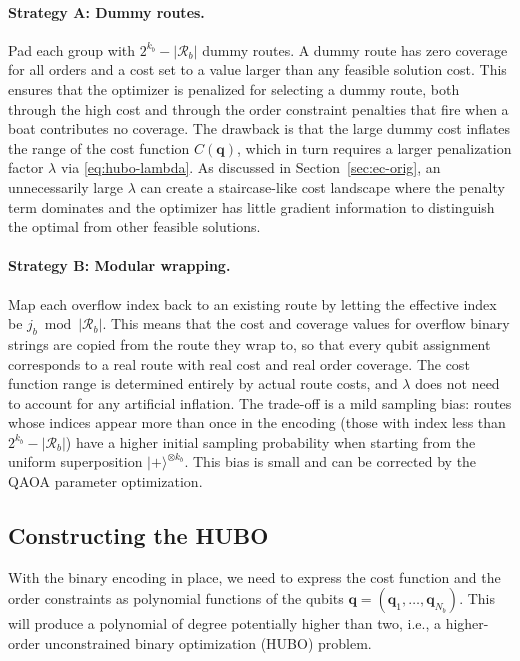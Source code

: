 \documentclass{article}
\begin{document}
\paragraph{Strategy A: Dummy routes.}
Pad each group with $2^{k_b} - |\mathcal{R}_b|$ dummy routes. A dummy route has zero coverage for all orders and a cost set to a value larger than any feasible solution cost. This ensures that the optimizer is penalized for selecting a dummy route, both through the high cost and through the order constraint penalties that fire when a boat contributes no coverage.
The drawback is that the large dummy cost inflates the range of the cost function $C(\mathbf{q})$, which in turn requires a larger penalization factor $\lambda$ via \eqref{eq:hubo-lambda}. As discussed in Section~\ref{sec:ec-orig}, an unnecessarily large $\lambda$ can create a staircase-like cost landscape where the penalty term dominates and the optimizer has little gradient information to distinguish the optimal from other feasible solutions.

\paragraph{Strategy B: Modular wrapping.}
Map each overflow index back to an existing route by letting the effective index be $j_b \bmod |\mathcal{R}_b|$. This means that the cost and coverage values for overflow binary strings are copied from the route they wrap to, so that every qubit assignment corresponds to a real route with real cost and real order coverage. The cost function range is determined entirely by actual route costs, and $\lambda$ does not need to account for any artificial inflation.
The trade-off is a mild sampling bias: routes whose indices appear more than once in the encoding (those with index less than $2^{k_b} - |\mathcal{R}_b|$) have a higher initial sampling probability when starting from the uniform superposition $|+\rangle^{\otimes k_b}$. This bias is small and can be corrected by the QAOA parameter optimization.

\subsection{Constructing the HUBO}
\label{sec:hubo-construction}
With the binary encoding in place, we need to express the cost function and the order constraints as polynomial functions of the qubits $\mathbf{q} = (\mathbf{q}_1, \ldots, \mathbf{q}_{N_b})$. This will produce a polynomial of degree potentially higher than two, i.e., a higher-order unconstrained binary optimization (HUBO) problem.
\end{document}
